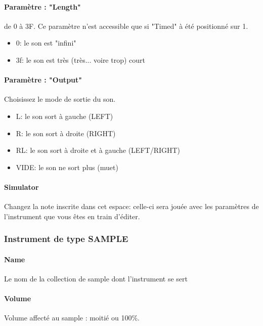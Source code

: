 \documentclass[12pt,a4paper]{article}
\begin{document}
        \paragraph{Paramètre : "Length"} de 0 à 3F. Ce paramètre n'est accessible que si "Timed" à été positionné sur 1.
            \begin{itemize}
                \item{0: le son est "infini"}
                \item{3f: le son est très (très... voire trop) court}
            \end{itemize}
        
        \paragraph{Paramètre : "Output"} Choisissez le mode de sortie du son.
            \begin{itemize}
                \item{L: le son sort à gauche (LEFT)}
                \item{R: le son sort à droite (RIGHT)}
                \item{RL: le son sort à droite et à gauche (LEFT/RIGHT)}
                \item{VIDE: le son ne sort plus (muet)}
            \end{itemize}
        
        \paragraph{Simulator} Changez la note inscrite dans cet espace: celle-ci sera jouée avec les paramètres de l'instrument que vous êtes en train d'éditer.
        
        \subsubsection{Instrument de type SAMPLE}
        
        
        \paragraph{Name} Le nom de la collection de sample dont l'instrument se sert

        \paragraph{Volume} Volume affecté au sample : moitié ou 100\%.
\end{document}

